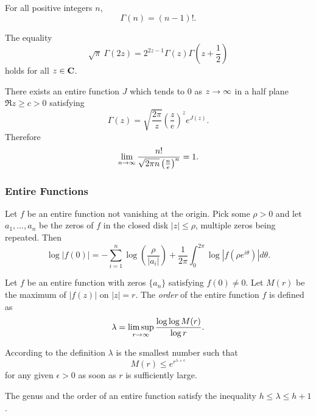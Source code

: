 \begin{proposition}
  For all positive integers $n$,
  \[
  \Gamma(n) = (n-1)!.
  \]
\end{proposition}

\begin{theorem}
  The equality
  \[
  \sqrt{\pi} \: \Gamma(2 z) = 2^{2 z - 1} \Gamma(z) \Gamma\left( z + \frac{1}{2} \right)
  \]
  holds for all $z \in \mathbf{C}$.
\end{theorem}

\begin{theorem}
  There exists an entire function $J$ which tends to $0$ as $z \rightarrow \infty$ in a half plane $\Re z \geq c > 0$ satisfying
  \[
  \Gamma(z) = \sqrt{\frac{2\pi}{z}} \left(\frac{z}{e}\right)^z e^{J(z)}.
  \]
  Therefore
  \[
  \lim_{n \rightarrow \infty} \frac{n!}{\sqrt{2 \pi n} \left( \frac{n}{e} \right)^n} = 1.
  \]
\end{theorem}

\subsubsection{Entire Functions}

\begin{theorem}
  Let $f$ be an entire function not vanishing at the origin. Pick some $\rho > 0$ and let $a_1, \dots, a_n$ be the zeros of $f$ in the closed disk $|z| \leq \rho$, multiple zeros being repeated. Then
  \[
  \log|f(0)| = -\sum_{i=1}^n \log\left(\frac{\rho}{|a_i|}\right) + \frac{1}{2\pi} \int_0^{2\pi} \log|f(\rho e^{i\theta})| d\theta.
  \]
\end{theorem}

\begin{definition}
  Let $f$ be an entire function with zeros $\{a_n\}$ satisfying $f(0) \neq 0$. Let $M(r)$ be the maximum of $|f(z)|$ on $|z| = r$. The \emph{order} of the entire function $f$ is defined as
  \[
  \lambda = \limsup_{r \rightarrow \infty} \frac{\log\log M(r)}{\log r}.
  \]
\end{definition}

According to the definition $\lambda$ is the smallest number such that
\[
M(r) \leq e^{r^{\lambda+\epsilon}}
\]
for any given $\epsilon > 0$ as soon as $r$ is sufficiently large.

\begin{theorem}
  The genus and the order of an entire function satisfy the inequality $h \leq \lambda \leq h+1$.
\end{theorem}

